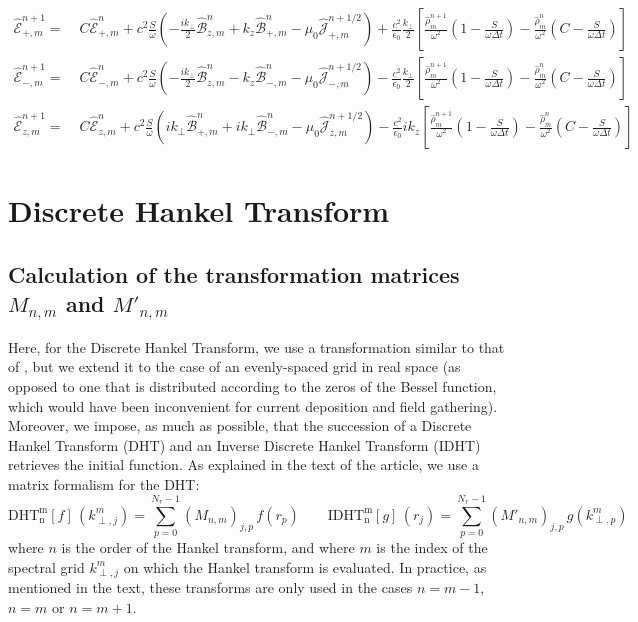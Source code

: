 \documentclass[1p,times]{elsarticle}
\newcommand{\tB}[2]{\spectral{B}_{#1,m}^{#2}}
\newcommand{\tE}[2]{\spectral{E}_{#1,m}^{#2}}
\newcommand{\tj}[2]{\spectral{J}_{#1,m}^{#2}}
\newcommand{\trho}[1]{\spectral{\rho}_{m}^{#1}}
\newcommand{\spectral}[1]{\hat{\mathcal{#1}}}
\begin{document}
\begin{subequations}
\begin{align}
\tE{+}{n+1} = \; & C \tE{+}{n} + 
c^2\frac{S}{\omega}\left(-\frac{ik_\perp }{2} \tB{z}{n} + k_z\tB{+}{n}
- \mu_0 \tj{+}{n+1/2} \right) + \frac{c^2}{\epsilon_0}
\frac{k_\perp}{2}\left[ \frac{\trho{n+1}}{\omega^2}\left(
  1 - \frac{S}{\omega\Delta t}\right) -
\frac{\trho{n}}{\omega^2}\left( C -\frac{S}{\omega\Delta t}\right)\right]  & \\
\tE{-}{n+1} =\; & C \tE{-}{n} +
c^2\frac{S}{\omega}\left(- \frac{ik_\perp }{2} \tB{z}{n} - k_z\tB{-}{n}
- \mu_0 \tj{-}{n+1/2} \right) - \frac{c^2}{\epsilon_0}
\frac{k_\perp}{2}\left[ \frac{\trho{n+1}}{\omega^2}\left(
  1 - \frac{S}{\omega\Delta t}\right) - \frac{\trho{n}}{\omega^2}
\left( C - \frac{S}{\omega\Delta t}\right)\right]  &\\
\tE{z}{n+1} =\; & C \tE{z}{n} + 
c^2\frac{S}{\omega}\left(ik_\perp \tB{+}{n} + ik_\perp \tB{-}{n}
- \mu_0 \tj{z}{n+1/2} \right) - \frac{c^2}{\epsilon_0}
ik_z\left[ \frac{\trho{n+1}}{\omega^2}\left(
  1 - \frac{S}{\omega\Delta t}\right) - \frac{\trho{n}}{\omega^2}
\left( C - \frac{S}{\omega\Delta t}\right)\right]  &
\end{align}
\end{subequations}

\section{Discrete Hankel Transform}
\label{sec:HTMatrix}

\subsection{Calculation of the transformation matrices $M_{n,m}$ and $M'_{n,m}$}

Here, for the Discrete Hankel Transform, we use a transformation
similar to that of \cite{Yu,Guizar,KaiMing}, but
we extend it to the case of an evenly-spaced grid in real space (as opposed to one
that is distributed according to the zeros of the Bessel
function, which would have been inconvenient for current deposition
and field gathering). Moreover, we impose, as much as possible, that the
succession of a Discrete Hankel Transform (DHT) and an Inverse Discrete
Hankel Transform (IDHT) retrieves the initial function. As explained in
the text of the article, we use a matrix formalism for the DHT:
\begin{equation} \mathrm{DHT^m_n}[f] \,(k^m_{\perp,j}) = \sum_{p=0}^{N_r-1} (M_{n,m})_{j,p}
\,f(r_p) \qquad \mathrm{IDHT^m_n}[g] \, (r_j) = \sum_{p=0}^{N_r-1}
(M'_{n,m})_{j,p} \,g(k^m_{\perp,p}) \end{equation}
\noindent where $n$ is the order of the Hankel transform, and where
$m$ is the index of the spectral grid
$k^m_{\perp,j}$ on which the Hankel transform is evaluated. 
In practice, as mentioned in the text, these
transforms are only used in the cases $n=m-1$, $n=m$ or $n=m+1$.
\end{document}
